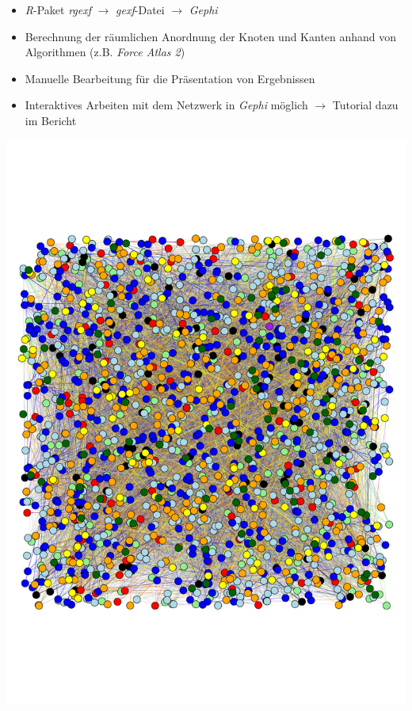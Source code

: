 \begin{frame}
	\begin{itemize}
		\item \textit{R}-Paket \textit{rgexf} $\rightarrow$ \textit{gexf}-Datei $\rightarrow$ \textit{Gephi}
		\item Berechnung der räumlichen Anordnung der Knoten und Kanten anhand von Algorithmen (z.B. \textit{Force Atlas 2})
		\item Manuelle Bearbeitung für die Präsentation von Ergebnissen
		\item Interaktives Arbeiten mit dem Netzwerk in \textit{Gephi} möglich $\rightarrow$ Tutorial dazu im Bericht
	\end{itemize}
	\centering\includegraphics[scale=0.2]{graphbegin.pdf}
\end{frame}
